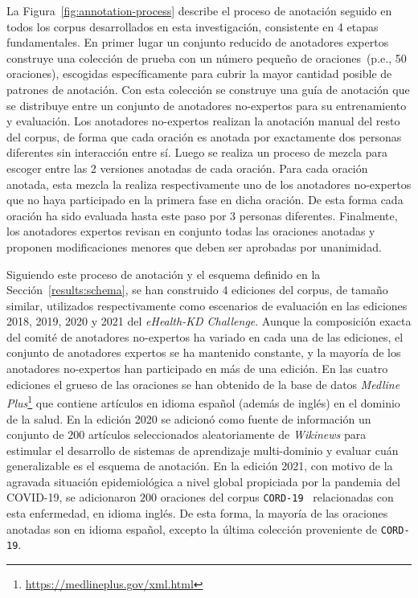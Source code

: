 La Figura~\ref{fig:annotation-process} describe el proceso de anotación seguido en todos los corpus desarrollados en esta investigación, consistente en 4 etapas fundamentales. En primer lugar un conjunto reducido de anotadores expertos
construye una colección de prueba con un número pequeño de oraciones~(p.e., 50 oraciones), escogidas específicamente
para cubrir la mayor cantidad posible de patrones de anotación. Con esta colección se construye una guía de anotación que se distribuye entre un conjunto de anotadores no-expertos para su entrenamiento y evaluación. Los anotadores no-expertos realizan la anotación manual del resto del corpus, de forma que cada oración es anotada por exactamente dos personas diferentes sin interacción entre sí.
Luego se realiza un proceso de mezcla para escoger entre las 2 versiones anotadas de cada oración.
Para cada oración anotada, esta mezcla la realiza respectivamente uno de los anotadores no-expertos que no haya participado en la primera fase en dicha oración. De esta forma cada oración ha sido evaluada hasta este paso por 3 personas diferentes.
Finalmente, los anotadores expertos revisan en conjunto todas las oraciones anotadas y proponen modificaciones menores que deben ser aprobadas por unanimidad.

Siguiendo este proceso de anotación y el esquema definido en la Sección~\ref{results:schema}, se han construido 4 ediciones del corpus, de tamaño similar, utilizados respectivamente como escenarios de evaluación en las ediciones 2018, 2019, 2020 y 2021 del \textit{eHealth-KD Challenge}.
Aunque la composición exacta del comité de anotadores no-expertos ha variado en cada una de las ediciones, el conjunto de anotadores expertos se ha mantenido constante, y la mayoría de los anotadores no-expertos han participado en más de una edición.
En las cuatro ediciones el grueso de las oraciones se han obtenido de la base de datos \textit{Medline Plus}\footnote{\url{https://medlineplus.gov/xml.html}} que contiene artículos en idioma español (además de inglés) en el dominio de la salud. En la edición 2020 se adicionó como fuente de información un conjunto de $200$ artículos seleccionados aleatoriamente de \textit{Wikinews} para estimular el desarrollo de sistemas de aprendizaje multi-dominio y evaluar cuán generalizable es el esquema de anotación.
En la edición 2021, con motivo de la agravada situación epidemiológica a nivel global propiciada por la pandemia del COVID-19, se adicionaron $200$ oraciones del corpus \texttt{CORD-19}~\cite{wang2020cord} relacionadas con esta enfermedad, en idioma inglés.
De esta forma, la mayoría de las oraciones anotadas son en idioma español, excepto la última colección proveniente de \texttt{CORD-19}.

